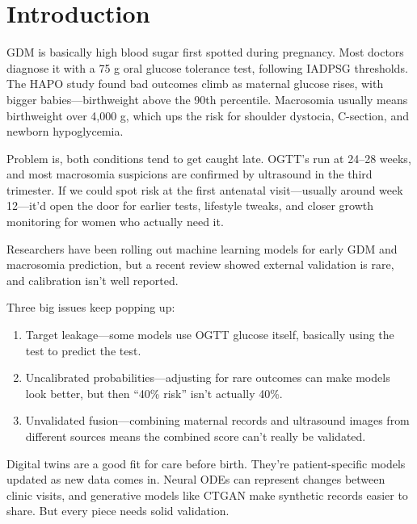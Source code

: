 \documentclass[conference]{IEEEtran}
\begin{document}
\section{Introduction}

GDM is basically high blood sugar first spotted during pregnancy. Most doctors diagnose it with a 75 g oral glucose tolerance test, following IADPSG thresholds. The HAPO study found bad outcomes climb as maternal glucose rises, with bigger babies---birthweight above the 90th percentile. Macrosomia usually means birthweight over 4,000 g, which ups the risk for shoulder dystocia, C-section, and newborn hypoglycemia.



Problem is, both conditions tend to get caught late. OGTT's run at 24--28 weeks, and most macrosomia suspicions are confirmed by ultrasound in the third trimester. If we could spot risk at the first antenatal visit---usually around week 12---it'd open the door for earlier tests, lifestyle tweaks, and closer growth monitoring for women who actually need it.



Researchers have been rolling out machine learning models for early GDM and macrosomia prediction, but a recent review showed external validation is rare, and calibration isn't well reported.



Three big issues keep popping up:



\begin{enumerate}

\item Target leakage---some models use OGTT glucose itself, basically using the test to predict the test.

\item Uncalibrated probabilities---adjusting for rare outcomes can make models look better, but then ``40\% risk'' isn't actually 40\%.

\item Unvalidated fusion---combining maternal records and ultrasound images from different sources means the combined score can't really be validated.

\end{enumerate}

Digital twins are a good fit for care before birth. They're patient-specific models updated as new data comes in. Neural ODEs can represent changes between clinic visits, and generative models like CTGAN make synthetic records easier to share. But every piece needs solid validation.
\end{document}
